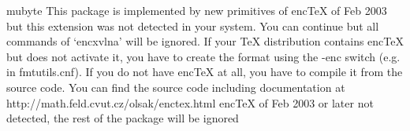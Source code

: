 
\expandafter\ifx\csname mubyte\endcsname\relax
   \newhelp\vlnahelp
    {This package is implemented by new primitives of encTeX of Feb 2003^^J
     but this extension was not detected in your system. You can continue^^J
     but all commands of `encxvlna' will be ignored. If your TeX distribution^^J
     contains encTeX but does not activate it, you have to create the format^^J
     using the -enc switch (e.g. in fmtutils.cnf). If you do not have encTeX^^J
     at all, you have to compile it from the source code. You can find^^J
     the source code including documentation at^^J
     http://math.feld.cvut.cz/olsak/enctex.html
    }
  \errhelp\vlnahelp
  \errmessage
    {encTeX of Feb 2003 or later not detected,^^Jthe rest of the package will be ignored}
  \expandafter\endinput\fi



\def\setmu #1#2{\mubyte #1##1 #2\endmubyte} %
\bgroup \uccode`X=\endlinechar \uppercase{\gdef\endchar{X}}
        \uccode`X=`\{          \uppercase{\gdef\leftbrace{X}}
\egroup

\def\sylabi #1{%
   \setmu \spacesylab {\space#1}     %
   \setmu \normalsylab {(#1}         %
   \setmu \normalsylab {\endchar#1}  %
   \setmu \normalsylab {[#1}         %
   \setmu \specsylab  {\leftbrace#1} %
}

\def\sylab #1{\sylabi {#1\space}\sylabi {#1\endchar}} 


\sylab v \sylab k \sylab o \sylab s \sylab u \sylab z
\sylab V \sylab K \sylab O \sylab S \sylab U \sylab Z
\sylab A \sylab I \sylab i \sylab a


\def\exx{\expandafter\expandafter\expandafter}
\def\spacesylab {\ifmmode\else\ifnum\catcode`\ =10 \exx\spacesylabP \fi\fi}
\def\normalsylab {\ifmmode\else\ifnum\catcode`\ =10 \exx\normalsylabP \fi\fi}
\def\specsylab {\ifmmode\else\ifnum\catcode`\ =10 \exx\specsylabP \fi\fi}
                
\def\spacesylabP {\afterassignment\spacesylabR \let\next= }
\def\spacesylabR {\ifhmode\unskip\fi \next \normalsylabP}
\def\normalsylabP #1 {#1~}
\def\specsylabP #1{{\normalsylabP #1}}

\def\uv{\futurelet\next\uvR}
\def\uvR{\ifx \next\specsylab \expandafter \uvS \else \expandafter \uvP \fi}
\long\def\uvP #1{\clqq#1\crqq}
\long\def\uvS \specsylab #1{\normalsylab \clqq#1\crqq}

\mubytein=2  %

\endinput



